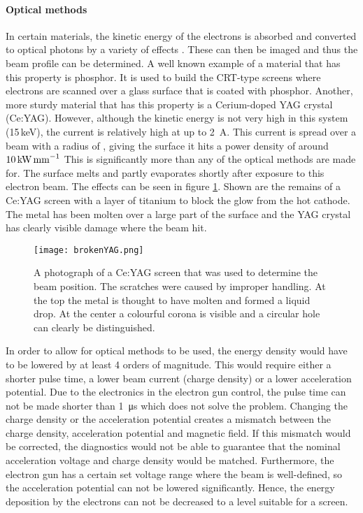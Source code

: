 \paragraph{Optical methods}
In certain materials, the kinetic energy of the electrons is absorbed and converted to optical photons by a variety of effects \cite{leo1994techniques}. These can then be imaged and thus the beam profile can be determined. A well known example of a material that has this property is phosphor. It is used to build the CRT-type screens where electrons are scanned over a glass surface that is coated with phosphor.
Another, more sturdy material that has this property is a Cerium-doped YAG crystal (Ce:YAG).
However, although the kinetic energy is not very high in this system (15\,keV), the current is relatively high at up to \SI{2}{\ampere}. This current is spread over a beam with a radius of , giving the surface it hits a power density of around $10\,\text{kW\,mm}^{-1}$
This is significantly more than any of the optical methods are made for. The surface melts and partly evaporates shortly after exposure to this electron beam. 
The effects can be seen in figure \ref{fig:brokenyag}. Shown are the remains of a Ce:YAG screen with a layer of titanium to block the glow from the hot cathode. The metal has been molten over a large part of the surface and the YAG crystal has clearly visible damage where the beam hit. 
\begin{figure}[h]
 \centering
 \texttt{[image: brokenYAG.png]}
 \caption{A photograph of a Ce:YAG screen that was used to determine the beam position. The scratches were caused by improper handling. At the top the metal is thought to have molten and formed a liquid drop. At the center a colourful corona is visible and a circular hole can clearly be distinguished.}
 \label{fig:brokenyag}
\end{figure}

In order to allow for optical methods to be used, the energy density would have to be lowered by at least 4 orders of magnitude. 
This would require either a shorter pulse time, a lower beam current (charge density) or a lower acceleration potential.
Due to the electronics in the electron gun control, the pulse time can not be made shorter than \SI{1}{\micro\second} which does not solve the problem. 
Changing the charge density or the acceleration potential creates a mismatch between the charge density, acceleration potential and magnetic field. If this mismatch would be corrected, the diagnostics would not be able to guarantee that the nominal acceleration voltage and charge density would be matched.
Furthermore, the electron gun has a certain set voltage range where the beam is well-defined, so the acceleration potential can not be lowered significantly.
Hence, the energy deposition by the electrons can not be decreased to a level suitable for a screen.

